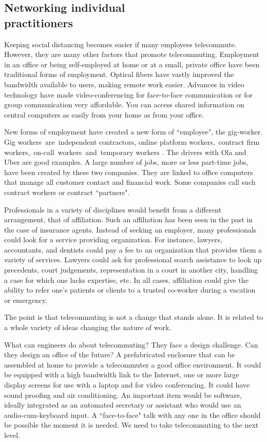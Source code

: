 \begin{multicols}{2}
\section{Networking individual\\ practitioners}\label{section-2}

Keeping social distancing becomes easier if many employees telecommute. However, they are many other factors that promote telecommuting. Employment in an office or being self-employed at home or at a small, private office have been traditional forms of employment. Optical fibers have vastly improved the bandwidth available to users, making remote work easier. Advances in video technology have made video-conferencing for face-to-face communication or for group communication very affordable. You can access shared information on central computers as easily from your home as from your office.

New forms of employment have created a new form of ``employee", the gig-worker. Gig workers are independent contractors, online platform workers, contract firm workers, on-call workers and temporary workers \cite{art3-key02}. The drivers with Ola and Uber are good examples. A large number of jobs, more or less part-time jobs, have been created by these two companies. They are linked to office computers that manage all customer contact and financial work. Some companies call such contract workers or contract ``partners".

Professionals in a variety of disciplines would benefit from a different arrangement, that of affiliation. Such an affiliation has been seen in the past in the case of insurance agents. Instead of seeking an employer, many professionals could look for a service providing organization. For instance, lawyers, accountants, and dentists could pay a fee to an organization that provides them a variety of services. Lawyers could ask for professional search assistance to look up precedents, court judgements, representation in a court in another city, handling a case for which one lacks expertise, etc. In all cases, affiliation could give the ability to refer one’s patients or clients to a trusted co-worker during a vacation or emergency.

The point is that telecommuting is not a change that stands alone. It is related to a whole variety of ideas changing the nature of work. 

What can engineers do about telecommuting? They face a design challenge. Can they design an office of the future?  A prefabricated enclosure that can be assembled at home to provide a telecommuter a good office environment. It could be equipped with a high bandwidth link to the Internet, one or more large display screens for use with a laptop and for video conferencing. It could have sound proofing and air conditioning. An important item would be software, ideally integrated as an automated secretary or assistant who would use an audio-cum-keyboard input. A ``face-to-face" talk with any one in the office should be possible the moment it is needed. We need to take telecommuting to the next level. 


\end{multicols}
